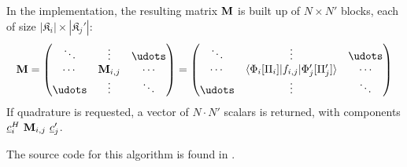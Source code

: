 In the implementation, the resulting matrix $\mathbf{M}$ is built up of $N \times
N'$ blocks, each of size $|\mathfrak{K}_i| \times |\mathfrak{K}_j'|$:
\begin{equation}
  \mat{M} = \begin{pmatrix} \ddots & \vdots & \udots \\
    \cdots & \mat{M}_{i,j} & \cdots \\
    \udots & \vdots & \ddots
  \end{pmatrix} =
  \begin{pmatrix} \ddots & \vdots & \udots \\
    \cdots & \langle \Phi_i[\Pi_i]|f_{i,j}|\Phi'_j[\Pi_j'] \rangle & \cdots \\
    \udots & \vdots & \ddots
  \end{pmatrix}
\end{equation}
If quadrature is requested, a vector of $N \cdot N'$ scalars is returned, with
components $\vect{c}_i^H \ \mat{M}_{i,j} \ \vect{c}'_j$.

The source code for this algorithm is found in
.
